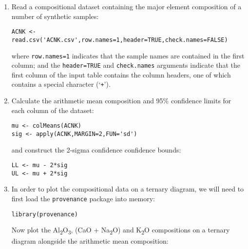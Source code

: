 \documentclass[11pt]{article}
\begin{document}
\begin{enumerate}

\item Read a compositional dataset containing the major element
  composition of a number of synthetic samples:

\begin{verbatim}
ACNK <- read.csv('ACNK.csv',row.names=1,header=TRUE,check.names=FALSE)
\end{verbatim}

where \texttt{row.names=1} indicates that the sample names are
contained in the first column; and the \texttt{header=TRUE} and
\texttt{check.names} arguments indicate that the first column of the
input table contains the column headers, one of which contains a
special character (`\texttt{+}').

\item Calculate the arithmetic mean composition and 95\% confidence
  limits for each column of the dataset:
  
\begin{verbatim}
mu <- colMeans(ACNK)
sig <- apply(ACNK,MARGIN=2,FUN='sd')
\end{verbatim}

\noindent and construct the 2-sigma confidence confidence bounds:

\begin{verbatim}
LL <- mu - 2*sig
UL <- mu + 2*sig
\end{verbatim}

\item In order to plot the compositional data on a ternary diagram, we
  will need to first load the \texttt{provenance} package into memory:
  
\begin{verbatim}
library(provenance)
\end{verbatim}

Now plot the Al\textsubscript{2}O\textsubscript{3}, (CaO +
Na\textsubscript{2}O) and K\textsubscript{2}O compositions on a
ternary diagram alongside the arithmetic mean composition:


\end{enumerate}
\end{document}
